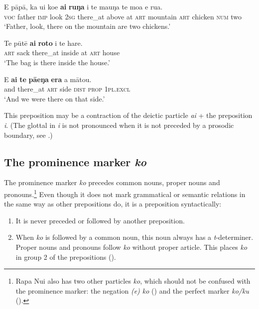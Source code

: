 \ea\label{ex:4.308}
\gll E pāpā, ka u{\ꞌ}i koe \textbf{{\ꞌ}ai} \textbf{ruŋa} i te ma{\ꞌ}uŋa te moa e rua. \\
\textsc{voc} father \textsc{imp} look \textsc{2sg} there\_at above at \textsc{art} mountain \textsc{art} chicken \textsc{num} two \\

\glt 
‘Father, look, there on the mountain are two chickens.’ \textstyleExampleref{[R104.052]} 
\z

\ea\label{ex:4.309}
\gll Te pūtē \textbf{{\ꞌ}ai} \textbf{roto} i te hare. \\
\textsc{art} sack there\_at inside at \textsc{art} house \\

\glt 
‘The bag is there inside the house.’ \textstyleExampleref{[R333.349]} 
\z

\ea\label{ex:4.310}
\gll {\ꞌ}E \textbf{{\ꞌ}ai} \textbf{te} \textbf{pā{\ꞌ}eŋa} \textbf{era} a mātou. \\
and there\_at \textsc{art} side \textsc{dist} \textsc{prop} \textsc{1pl.excl} \\

\glt
‘And we were there on that side.’ \textstyleExampleref{[R623.047]}
\z

This preposition may be a contraction of the deictic particle \textit{{\ꞌ}ai} + the preposition \textit{{\ꞌ}i}. (The glottal in \textit{{\ꞌ}i} is not pronounced when it is not preceded by a prosodic boundary, see .) 
\subsection{The prominence marker \textit{ko}}\label{sec:4.7.11}
The prominence marker \textit{ko} precedes common nouns, proper nouns and pronouns.\footnote{\label{fn:240}Rapa Nui also has two other particles \textit{ko}, which should not be confused with the prominence marker: the negation \textit{(e) ko} () and the perfect marker \textit{ko/ku} ().}  Even though it does not mark grammatical or semantic relations in the same way as other prepositions do, it is a preposition syntactically:

\begin{enumerate}
\item 
It is never preceded or followed by another preposition. 

\item 
When \textit{ko} is followed by a common noun, this noun always has a \textit{t}{}-determiner. Proper nouns and pronouns follow \textit{ko} without proper article. This places \textit{ko} in group 2 of the prepositions ().

\end{enumerate}

